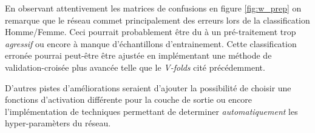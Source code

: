 \documentclass[11pt]{article}
\begin{document}
En observant attentivement les matrices de
confusions en figure \ref{fig:w_prep} on remarque que le r\'eseau commet
principalement des erreurs lors de la classification Homme/Femme. Ceci pourrait
probablement \^etre du \`a un pr\'e-traitement trop {\em agressif} ou encore \`a
manque d'\'echantillons d'entrainement. Cette classification erron\'ee pourrai
peut-\^etre \^etre ajust\'ee en impl\'ementant une m\'ethode de
validation-crois\'ee plus avanc\'ee telle que le {\em V-folds} cit\'e pr\'ec\'edemment.

D'autres pistes d'am\'eliorations seraient d'ajouter la possibilit\'e de choisir une
fonctions d'activation diff\'erente pour la couche de sortie ou encore
l'impl\'ementation de techniques permettant de determiner {\em automatiquement}
les hyper-param\`eters du r\'eseau.


\newpage
\appendix
\end{document}
